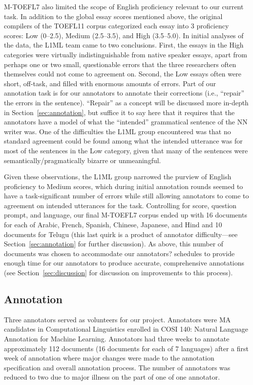 \documentclass[10pt, a4paper]{article}
\begin{document}
M-TOEFL7 also limited the scope of English proficiency relevant to our current task. In addition to the global essay scores mentioned above, the original compilers of the TOEFL11 corpus categorized each essay into 3 proficiency scores: Low (0--2.5), Medium (2.5--3.5), and High (3.5--5.0). In initial analyses of the data, the L1ML team came to two conclusions. First, the essays in the High categories were virtually indistinguishable from native speaker essays, apart from perhaps one or two small, questionable errors that the three researchers often themselves could not come to agreement on. Second, the Low essays often were short, off-task, and filled with enormous amounts of errors. Part of our annotation task is for our annotators to annotate their corrections (i.e., ``repair'' the errors in the sentence). ``Repair'' as a concept will be discussed more in-depth in Section~\ref{sec:annotation}, but suffice it to say here that it requires that the annotators have a model of what the ``intended'' grammatical sentence of the NN writer was. One of the difficulties the L1ML group encountered was that no standard agreement could be found among what the intended utterance was for most of the sentences in the Low category, given that many of the sentences were semantically/pragmatically bizarre or unmeaningful. 

Given these observations, the L1ML group narrowed the purview of English proficiency to Medium scores, which during initial annotation rounds seemed to have a task-significant number of errors while still allowing annotators to come to agreement on intended utterances for the task. Controlling for score, question prompt, and language, our final M-TOEFL7 corpus ended up with 16 documents for each of Arabic, French, Spanish, Chinese, Japanese, and Hind and 10 documents for Telugu (this last quirk is a product of annotator difficulty---see Section~\ref{sec:annotation} for further discussion). As above, this number of documents was chosen to accommodate our annotators? schedules to provide enough time for our annotators to produce accurate, comprehensive annotations (see Section~\ref{sec:discussion} for discussion on improvements to this process).


\subsection{Annotation\label{sec:annotation}}

Three annotators served as volunteers for our project. Annotators were MA candidates in Computational Linguistics enrolled in COSI 140: Natural Language Annotation for Machine Learning. Annotators had three weeks to annotate approximately 112 documents (16 documents for each of 7 languages) after a first week of annotation where major changes were made to the annotation specification and overall annotation process. The number of annotators was reduced to two due to major illness on the part of one of one annotator.
\end{document}
